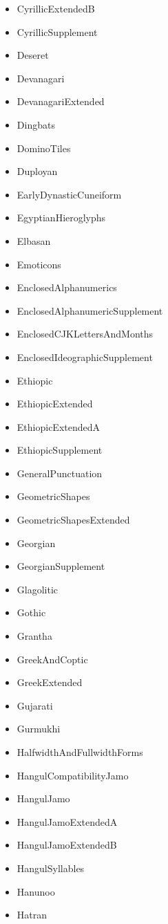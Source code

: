 ﻿\documentclass{article}
\newenvironment{itemlist}{%
  \begin{itemize}
	\setlength{\itemsep}{0pt}
	\setlength{\parsep}{0pt}
	\setlength{\topsep}{0pt}
	\setlength{\partopsep}{0pt}
	\setlength{\parskip}{0pt}
	\setlength{\labelsep}{5pt}}%
{
  \end{itemize}}
\begin{document}
\begin{multicols}{2}
\begin{itemlist}
				\item CyrillicExtendedB
				\item CyrillicSupplement
				\item Deseret
				\item Devanagari
				\item DevanagariExtended
				\item Dingbats
				\item DominoTiles
				\item Duployan
				\item EarlyDynasticCuneiform
				\item EgyptianHieroglyphs
				\item Elbasan
				\item Emoticons
				\item EnclosedAlphanumerics
				\item EnclosedAlphanumericSupplement
				\item EnclosedCJKLettersAndMonths
				\item EnclosedIdeographicSupplement
				\item Ethiopic
				\item EthiopicExtended
				\item EthiopicExtendedA
				\item EthiopicSupplement
				\item GeneralPunctuation
				\item GeometricShapes
				\item GeometricShapesExtended
				\item Georgian
				\item GeorgianSupplement
				\item Glagolitic
				\item Gothic
				\item Grantha
				\item GreekAndCoptic
				\item GreekExtended
				\item Gujarati
				\item Gurmukhi
				\item HalfwidthAndFullwidthForms
				\item HangulCompatibilityJamo
				\item HangulJamo
				\item HangulJamoExtendedA
				\item HangulJamoExtendedB
				\item HangulSyllables
				\item Hanunoo
				\item Hatran

\end{itemlist}
\end{multicols}
\end{document}
